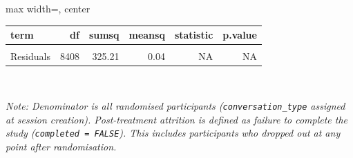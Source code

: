 \renewcommand{\arraystretch}{1.2}
\begin{adjustbox}{max width=\linewidth, center}
\begingroup\fontsize{10}{12}\selectfont

\begin{tabular}{lrrrrr}
\toprule
\textbf{term} & \textbf{df} & \textbf{sumsq} & \textbf{meansq} & \textbf{statistic} & \textbf{p.value}\\
\midrule
\cellcolor{gray!15}{Condition} & \cellcolor{gray!15}{3} & \cellcolor{gray!15}{0.13} & \cellcolor{gray!15}{0.04} & \cellcolor{gray!15}{1.1} & \cellcolor{gray!15}{0.349}\\
Residuals & 8408 & 325.21 & 0.04 & NA & NA\\
\bottomrule
\end{tabular}
\endgroup{}

\end{adjustbox}
\\[3pt]
\begin{minipage}{\linewidth}
\raggedright\footnotesize\textit{Note: Denominator is all randomised participants (\texttt{conversation\_type} assigned at session creation). Post-treatment attrition is defined as failure to complete the study (\texttt{completed = FALSE}). This includes participants who dropped out at any point after randomisation.}
\end{minipage}


